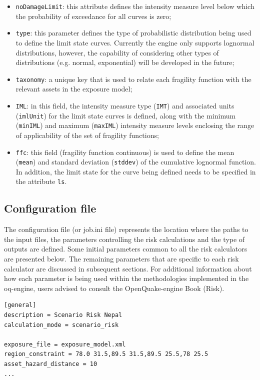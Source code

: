 \begin{itemize}
\item  \Verb+noDamageLimit+: this attribute defines the intensity measure level below which the probability of exceedance for all curves is zero;
\item  \Verb+type+: this parameter defines the type of probabilistic distribution being used to define the limit state curves. Currently the engine only supports lognormal distributions, however, the capability of considering other types of distributions (e.g. normal, exponential) will be developed in the future;
\item  \Verb+taxonomy+: a unique key that is used to relate each \gls{fragility function} with the relevant \glspl{asset} in the \gls{exposure model};  
\item  \Verb+IML+: in this field, the intensity measure type (\Verb+IMT+) and associated units (\Verb+imlUnit+) for the limit state curves is defined, along with the minimum (\Verb+minIML+) and maximum (\Verb+maxIML+) intensity measure levels enclosing the range of applicability of the set of fragility functions;
\item  \Verb+ffc+: this field (fragility function continuous) is used to define the mean (\Verb+mean+) and standard deviation (\Verb+stddev+) of the cumulative lognormal function. In addition, the limit state for the curve being defined needs to be specified in the attribute \Verb+ls+.
\end{itemize}

\subsection{Configuration file}
The configuration file (or job.ini file) represents the location where the paths to the input files, the parameters controlling the risk calculations and the type of outputs are defined. Some initial parameters common to all the risk calculators are presented below. The remaining parameters that are specific to each risk calculator are discussed in subsequent sections. For additional information about how each parameter is being used within the methodologies implemented in the oq-engine, users advised to consult the OpenQuake-engine Book (Risk).

\begin{Verbatim}[frame=single, commandchars=\\\{\}, samepage=true]
[general]
description = Scenario Risk Nepal
calculation_mode = scenario_risk

exposure_file = exposure_model.xml
region_constraint = 78.0 31.5,89.5 31.5,89.5 25.5,78 25.5
asset_hazard_distance = 10
...
\end{Verbatim}

